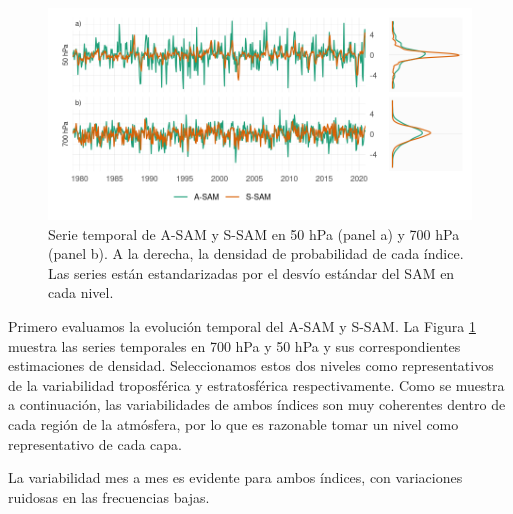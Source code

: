 \documentclass[12pt,oneside,a4paper]{reedthesis}
\begin{document}
\begin{figure}

{\centering \includegraphics{figures/30-sam/asymsam-timeseries-1} 

}

\caption{Serie temporal de A-SAM y S-SAM en 50 hPa (panel a) y 700 hPa (panel b). A la derecha, la densidad de probabilidad de cada índice. Las series están estandarizadas por el desvío estándar del SAM en cada nivel.}\label{fig:asymsam-timeseries}
\end{figure}

Primero evaluamos la evolución temporal del A-SAM y S-SAM.
La Figura \ref{fig:asymsam-timeseries} muestra las series temporales en 700 hPa y 50 hPa y sus correspondientes estimaciones de densidad.
Seleccionamos estos dos niveles como representativos de la variabilidad troposférica y estratosférica respectivamente.
Como se muestra a continuación, las variabilidades de ambos índices son muy coherentes dentro de cada región de la atmósfera, por lo que es razonable tomar un nivel como representativo de cada capa.

La variabilidad mes a mes es evidente para ambos índices, con variaciones ruidosas en las frecuencias bajas.
\end{document}
